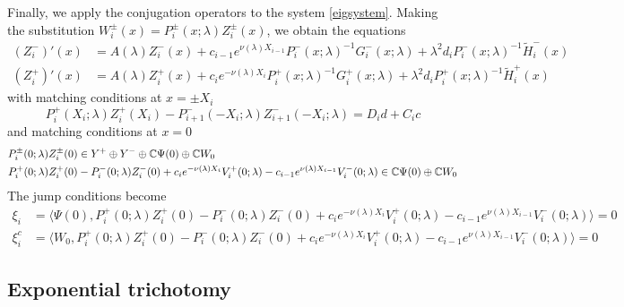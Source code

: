 \documentclass[10pt,reqno]{amsart}
\theoremstyle{plain}
\theoremstyle{definition}
\theoremstyle{remark}
\numberwithin{theorem}{section}
\numberwithin{equation}{section}
\begin{document}
Finally, we apply the conjugation operators to the system \cref{eigsystem}. Making the substitution $W_i^\pm(x) = P_i^\pm(x; \lambda) Z_i^\pm(x)$, we obtain the equations
\begin{equation}\label{systemZ}
\begin{aligned}
(Z_i^-)'(x) &= A(\lambda) Z_i^-(x) + c_{i-1} e^{\nu(\lambda)X_{i-1}}  P_i^-(x; \lambda)^{-1} G_i^-(x; \lambda) + \lambda^2 d_i P_i^-(x; \lambda)^{-1} \tilde{H}_i^-(x) \\
(Z_i^+)'(x) &= A(\lambda) Z_i^+(x) + c_i e^{-\nu(\lambda)X_i}  P_i^+(x; \lambda)^{-1} G_i^+(x; \lambda) + \lambda^2 d_i P_i^+(x; \lambda)^{-1} \tilde{H}_i^+(x)
\end{aligned}
\end{equation}
with matching conditions at $x = \pm X_i$
\begin{equation}\label{systemmiddle}
P_i^+(X_i; \lambda) Z_i^+(X_i) - P_{i+1}^-(-X_i; \lambda) Z_{i+1}^-(-X_i; \lambda) = D_i d + C_i c 
\end{equation}
and matching conditions at $x = 0$
\begin{equation}\label{systemcenter}
\begin{aligned}
P_i^\pm(0; \lambda) Z_i^\pm(0) &\in Y^+ \oplus Y^- \oplus \mathbb{C} \Psi(0) \oplus \mathbb{C} W_0 \\
P_i^+(0; \lambda)Z_i^+(0) &- P_i^-(0; \lambda) Z_i^-(0) + c_i e^{-\nu(\lambda)X_i}V_i^+(0; \lambda) - c_{i-1} e^{\nu(\lambda)X_{i-1}} V_i^-(0; \lambda) \in \mathbb{C} \Psi(0) \oplus \mathbb{C} W_0
\end{aligned}
\end{equation}
The jump conditions become
\begin{equation}\label{jumpcondZ}
\begin{aligned}
\xi_i &= \langle \Psi(0), P_i^+(0; \lambda) Z_i^+(0) - P_i^-(0; \lambda) Z_i^-(0) + c_i e^{-\nu(\lambda)X_i}V_i^+(0; \lambda) - c_{i-1} e^{\nu(\lambda)X_{i-1}} V_i^-(0; \lambda) \rangle = 0  \\
\xi_i^c &= \langle W_0, P_i^+(0; \lambda) Z_i^+(0) - P_i^-(0; \lambda) Z_i^-(0) + c_i e^{-\nu(\lambda)X_i}V_i^+(0; \lambda) - c_{i-1} e^{\nu(\lambda)X_{i-1}} V_i^-(0; \lambda) \rangle = 0 
\end{aligned}
\end{equation}

\subsection{Exponential trichotomy}\label{sec:trichotomy}
\end{document}
